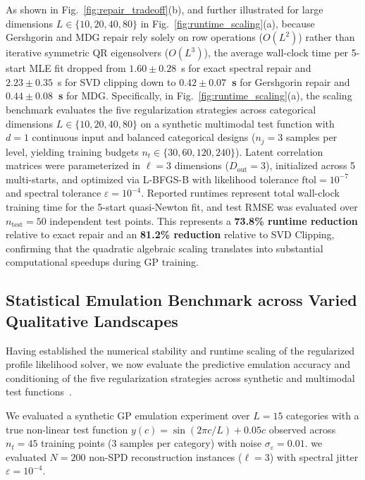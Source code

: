 \documentclass[default,sn-mathphys,Numbered]{sn-jnl}
\theoremstyle{thmstyleone}
\theoremstyle{thmstylethree}
\theoremstyle{thmstyletwo}
\newcommand{\outp}{\text{out}}
\begin{document}
As shown in Fig.~\ref{fig:repair_tradeoff}(b), and further illustrated for large dimensions $L \in \{10, 20, 40, 80\}$ in Fig.~\ref{fig:runtime_scaling}(a), because Gershgorin and MDG repair rely solely on row operations ($O(L^2)$) rather than iterative symmetric QR eigensolvers ($O(L^3)$), the average wall-clock time per 5-start MLE fit dropped from $1.60 \pm 0.28$~s for exact spectral repair and $2.23 \pm 0.35$~s for SVD clipping down to \textbf{$0.42 \pm 0.07$~s} for Gershgorin repair and \textbf{$0.44 \pm 0.08$~s} for MDG. Specifically, in Fig.~\ref{fig:runtime_scaling}(a), the scaling benchmark evaluates the five regularization strategies across categorical dimensions $L \in \{10, 20, 40, 80\}$ on a synthetic multimodal test function with $d = 1$ continuous input and balanced categorical designs ($n_j = 3$ samples per level, yielding training budgets $n_t \in \{30, 60, 120, 240\}$). Latent correlation matrices were parameterized in $\ell = 3$ dimensions ($D_{\outp} = 3$), initialized across 5 multi-starts, and optimized via L-BFGS-B with likelihood tolerance $\mathrm{ftol} = 10^{-7}$ and spectral tolerance $\varepsilon = 10^{-4}$. Reported runtimes represent total wall-clock training time for the 5-start quasi-Newton fit, and test RMSE was evaluated over $n_{\mathrm{test}} = 50$ independent test points. This represents a \textbf{73.8\% runtime reduction} relative to exact repair and an \textbf{81.2\% reduction} relative to SVD Clipping, confirming that the quadratic algebraic scaling translates into substantial computational speedups during GP training.

\subsection{Statistical Emulation Benchmark across Varied Qualitative Landscapes}
\label{sec:multifunction_benchmark}\label{subsec:multifunc}\label{subsec:sim_benchmarks}

Having established the numerical stability and runtime scaling of the regularized profile likelihood solver, we now evaluate the predictive emulation accuracy and conditioning of the five regularization strategies across synthetic and multimodal test functions~\citep{helmer2024stability}.


We evaluated a synthetic GP emulation experiment over $L = 15$ categories with a true non-linear test function $y(c) = \sin(2\pi c / L) + 0.05 c$ observed across $n_t = 45$ training points ($3$ samples per category) with noise $\sigma_{\varepsilon} = 0.01$. we evaluated $N = 200$ non-SPD reconstruction instances ($\ell = 3$) with spectral jitter $\varepsilon = 10^{-4}$.
\end{document}
